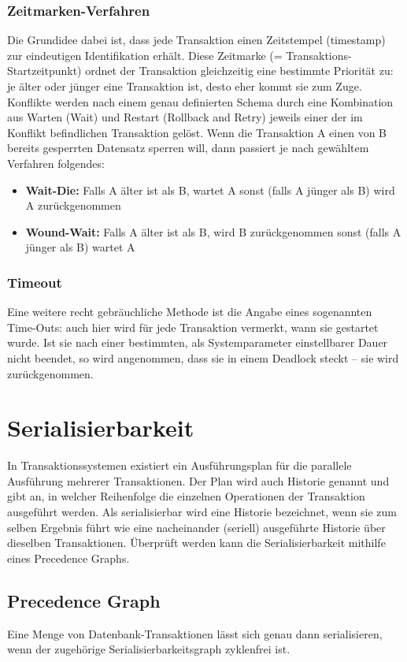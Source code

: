 \subsubsection{Zeitmarken-Verfahren}
Die Grundidee dabei ist, dass jede Transaktion einen Zeitstempel (timestamp) zur eindeutigen Identifikation erhält. Diese Zeitmarke (= Transaktions-Startzeitpunkt) ordnet der Transaktion gleichzeitig eine bestimmte Priorität zu: je älter oder jünger eine Transaktion ist, desto eher kommt sie zum Zuge. Konflikte werden nach einem genau definierten Schema durch eine Kombination aus Warten (Wait) und Restart (Rollback and Retry) jeweils einer der im Konflikt befindlichen Transaktion gelöst.
\newline
Wenn die Transaktion A einen von B bereits gesperrten Datensatz sperren will, dann passiert je nach gewähltem Verfahren folgendes:
\begin{itemize}
    \item \textbf{Wait-Die:} Falls A älter ist als B, wartet A sonst (falls A jünger als B) wird A zurückgenommen
    \item \textbf{Wound-Wait:} Falls A älter ist als B, wird B zurückgenommen sonst (falls A jünger als B) wartet A
\end{itemize}

\subsubsection{Timeout}
Eine weitere recht gebräuchliche Methode ist die Angabe eines sogenannten Time-Outs: auch hier wird für jede Transaktion vermerkt, wann sie gestartet wurde. Ist sie nach einer bestimmten, als Systemparameter einstellbarer Dauer nicht beendet, so wird angenommen, dass sie in einem Deadlock steckt – sie wird zurückgenommen.

\section{Serialisierbarkeit}
In Transaktionssystemen existiert ein Ausführungsplan für die parallele Ausführung mehrerer Transaktionen. Der Plan wird auch Historie genannt und gibt an, in welcher Reihenfolge die einzelnen Operationen der Transaktion ausgeführt werden. Als serialisierbar wird eine Historie bezeichnet, wenn sie zum selben Ergebnis führt wie eine nacheinander (seriell) ausgeführte Historie über dieselben Transaktionen. Überprüft werden kann die Serialisierbarkeit mithilfe eines Precedence Graphs.

\subsection{Precedence Graph}
Eine Menge von Datenbank-Transaktionen lässt sich genau dann serialisieren, wenn der zugehörige Serialisierbarkeitsgraph zyklenfrei ist.
